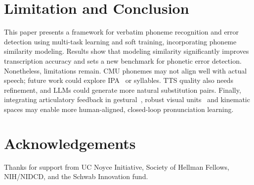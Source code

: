 \section{Limitation and Conclusion}
This paper presents a framework for verbatim phoneme recognition and error detection using multi-task learning and soft training, incorporating phoneme similarity modeling. Results show that modeling similarity significantly improves transcription accuracy and sets a new benchmark for phonetic error detection. Nonetheless, limitations remain. CMU phonemes may not align well with actual speech; future work could explore IPA~\cite{ipa_wikipedia} or syllables. TTS quality also needs refinement, and LLMs could generate more natural substitution pairs. Finally, integrating articulatory feedback in gestural~\cite{ssdm, lian22bcsnmf, lian2023factor, wu23k_interspeech}, robust visual units~\cite{lian2023av} and kinematic spaces may enable more human-aligned, closed-loop pronunciation learning.

\section{Acknowledgements}
Thanks for support from UC Noyce Initiative, Society of Hellman Fellows, NIH/NIDCD, and the Schwab Innovation fund.